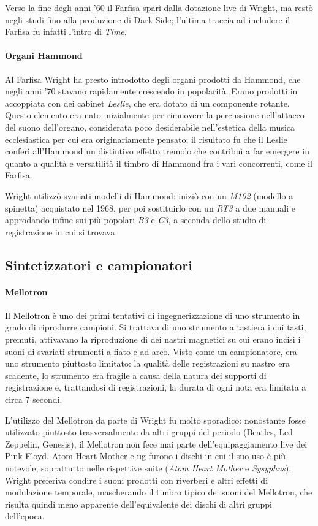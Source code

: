 \documentclass[class=book, crop=false, oneside, 12pt]{standalone}
\begin{document}
    Verso la fine degli anni '60 il Farfisa sparì dalla dotazione live di Wright, ma restò negli studi fino alla produzione di Dark Side; l'ultima traccia ad includere il Farfisa fu infatti l'intro di \emph{Time}.

    \paragraph{Organi Hammond}
    Al Farfisa Wright ha presto introdotto degli organi prodotti da Hammond, che negli anni '70 stavano rapidamente crescendo in popolarità. Erano prodotti in accoppiata con dei cabinet \emph{Leslie}, che era dotato di un componente rotante. Questo elemento era nato inizialmente per rimuovere la percussione nell'attacco del suono dell'organo, considerata poco desiderabile nell'estetica della musica ecclesiastica per cui era originariamente pensato; il risultato fu che il Leslie conferì all'Hammond un distintivo effetto tremolo che contribuì a far emergere in quanto a qualità e versatilità il timbro di Hammond fra i vari concorrenti, come il Farfisa.

    Wright utilizzò svariati modelli di Hammond: iniziò con un \emph{M102} (modello a spinetta) acquistato nel 1968, per poi sostituirlo con un \emph{RT3} a due manuali e approdando infine sui più popolari \emph{B3} e \emph{C3}, a seconda dello studio di registrazione in cui si trovava.
    
    \subsection{Sintetizzatori e campionatori}
    \paragraph{Mellotron}
    Il Mellotron è uno dei primi tentativi di ingegnerizzazione di uno strumento in grado di riprodurre campioni. Si trattava di uno strumento a tastiera i cui tasti, premuti, attivavano la riproduzione di dei nastri magnetici su cui erano incisi i suoni di svariati strumenti a fiato e ad arco. Visto come un campionatore, era uno strumento piuttosto limitato: la qualità delle registrazioni su nastro era scadente, lo strumento era fragile a causa della natura dei supporti di registrazione e, trattandosi di registrazioni, la durata di ogni nota era limitata a circa 7 secondi.

    L'utilizzo del Mellotron da parte di Wright fu molto sporadico: nonostante fosse utilizzato piuttosto trasversalmente da altri gruppi del periodo (Beatles, Led Zeppelin, Genesis), il Mellotron non fece mai parte dell'equipaggiamento live dei Pink Floyd. Atom Heart Mother e \acrshort{ug} furono i dischi in cui il suo uso è più notevole, soprattutto nelle rispettive suite (\emph{Atom Heart Mother} e \emph{Sysyphus}). Wright preferiva condire i suoni prodotti con riverberi e altri effetti di modulazione temporale, mascherando il timbro tipico dei suoni del Mellotron, che risulta quindi meno apparente dell'equivalente dei dischi di altri gruppi dell'epoca.
\end{document}
